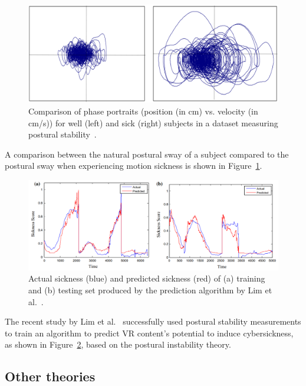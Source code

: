 \begin{figure}[h]
    \centering
    \includegraphics[width=\textwidth]{content/related_work/img/PosturalStability[Smart2013]}
    \caption{Comparison of phase portraits (position (in cm) vs. velocity (in cm/s)) for well (left) and sick (right)
        subjects in a dataset measuring postural stability~\cite{Smart2013}.}
    \label{fig:postural-instability-sample}
\end{figure}
A comparison between the natural postural sway of a subject compared to the postural sway when experiencing motion
sickness is shown in Figure~\ref{fig:postural-instability-sample}.
\begin{figure}[h]
    \centering
    \includegraphics[width=\textwidth]{content/related_work/img/PosturalStabilitySicknessPrediction[Lim2020]}
    \caption{Actual sickness (blue) and predicted sickness (red) of (a) training and (b) testing set produced by the
    prediction algorithm by Lim et al.~\cite{Lim2020}.}
    \label{fig:sickness-prediction-algorithm}
\end{figure}
The recent study by Lim et al.~\cite{Lim2020} successfully used postural stability measurements to train an algorithm
to predict VR content's potential to induce cybersickness, as shown in Figure~\ref{fig:sickness-prediction-algorithm},
based on the postural instability theory.


\subsection{Other theories}\label{subsec:other-theories}

